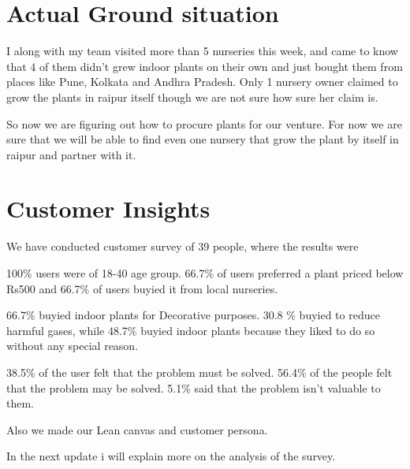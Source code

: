 \documentclass{article}
\begin{document}
\section{Actual Ground situation}

I along with my team visited more than 5 nurseries this week, and came to know that 4 of them didn't grew indoor plants on their own and just bought them from places like Pune, Kolkata and Andhra Pradesh. Only 1 nursery owner claimed to grow the plants in raipur itself though we are not sure how sure her claim is. 

So now we are figuring out how to procure plants for our venture. For now we are sure that we will be able to find even one nursery that grow the plant by itself in raipur and partner with it.


\section{Customer Insights}

We have conducted customer survey of 39 people, where the results were 

100\% users were of 18-40 age group.
66.7\% of users preferred a plant priced below Rs500 and 66.7\% of users buyied it from local nurseries.

66.7\% buyied indoor plants for Decorative purposes. 30.8 \% buyied to reduce harmful gases, while 48.7\% buyied indoor plants because they liked to do so without any special reason.

38.5\% of the user felt that the problem must be solved.
56.4\% of the people felt that the problem may be solved.
5.1\% said that the problem isn't valuable to them.

Also we made our Lean canvas and customer persona.

In the next update i will explain more on the analysis of the survey.
\end{document}
